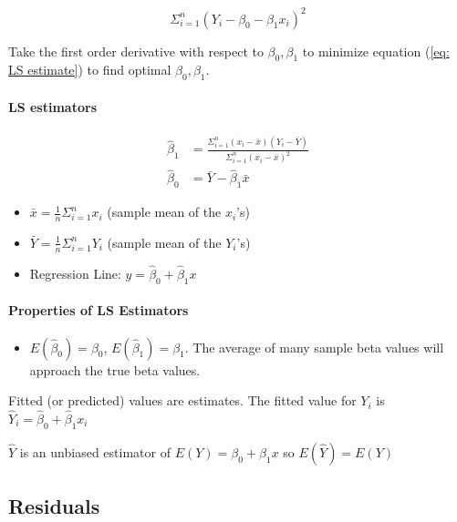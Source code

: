 \documentclass[10pt]{article}
\newcommand{\hlDef}[1]{\colorbox{Thistle2}{#1}}
\newcommand{\hlEmph}[1]{\colorbox{DarkSeaGreen2}{#1}}
\begin{document}
\begin{multicols}{3}
    \begin{equation}\label{eq: LS estimate}
        \Sigma_{i=1}^{n} (Y_i - \beta_0 - \beta_1 x_i)^2
    \end{equation}

    Take the first order derivative with respect to $\beta_0, \beta_1$ to \hlEmph{minimize} equation (\ref{eq: LS estimate}) to find optimal $\beta_0, \beta_1$.

    \paragraph{LS estimators}

    \begin{align}\label{eq: beta LS estimate}
        \hat \beta_1 & = \frac{\Sigma_{i=1}^{n}(x_i - \bar x)(Y_i - \bar Y)}{\Sigma_{i=1}^{n} (x_i - \bar x)^2} \\
        \hat \beta_0 & = \bar Y - \hat \beta_1 \bar x
    \end{align}

    \begin{itemize}
        \item $\bar x = \frac{1}{n} \Sigma_{i=1}^{n} x_i$ (sample mean of the $x_i$'s)
        \item $\bar Y = \frac{1}{n} \Sigma_{i=1}^{n} Y_i$ (sample mean of the $Y_i$'s)
        \item Regression Line: $y = \hat \beta_0 + \hat \beta_1 x$
    \end{itemize}

    \paragraph{Properties of LS Estimators}
    \begin{itemize}
        \item $E(\hat \beta_0) = \beta_0$, $E(\hat\beta_1) = \beta_1$. The average of many sample beta values will approach the true beta values.
    \end{itemize}

    \hlDef{Fitted} (or predicted) values are estimates. The fitted value for $Y_i$ is $\hat Y_i = \hat\beta_0 + \hat\beta_1x_i$

    $\hat Y$ is an \hlDef{unbiased estimator} of $E(Y) = \beta_0 + \beta_1 x$ so $E(\hat Y) = E(Y)$

    \vspace{10px}

    \subsection{Residuals}


\end{multicols}
\end{document}
